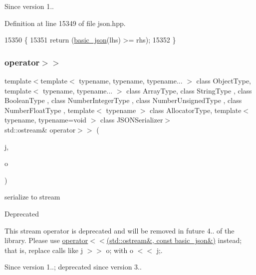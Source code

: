 \begin{DoxySince}{Since}
version 1.. 
\end{DoxySince}


Definition at line 15349 of file json.\+hpp.


\begin{DoxyCode}
15350     \{
15351         \textcolor{keywordflow}{return} (\hyperlink{classnlohmann_1_1basic__json_aed115142bd0c6c66c864700e0467df55}{basic\_json}(lhs) >= rhs);
15352     \}
\end{DoxyCode}
\mbox{\label{classnlohmann_1_1basic__json_a34d6a60dd99e9f33b8273a1c8db5669b}} 
\subsubsection{\texorpdfstring{operator$>$$>$}{operator>>}\hspace{0.1cm}{\footnotesize\ttfamily [1/2]}}
{\footnotesize\ttfamily template$<$template$<$ typename, typename, typename... $>$ class Object\+Type, template$<$ typename, typename... $>$ class Array\+Type, class String\+Type , class Boolean\+Type , class Number\+Integer\+Type , class Number\+Unsigned\+Type , class Number\+Float\+Type , template$<$ typename $>$ class Allocator\+Type, template$<$ typename, typename=void $>$ class J\+S\+O\+N\+Serializer$>$ \\
std\+::ostream\& operator$>$$>$ (\begin{DoxyParamCaption}\item[{const \hyperlink{classnlohmann_1_1basic__json}{basic\+\_\+json}$<$ Object\+Type, Array\+Type, String\+Type, Boolean\+Type, Number\+Integer\+Type, Number\+Unsigned\+Type, Number\+Float\+Type, Allocator\+Type, J\+S\+O\+N\+Serializer $>$ \&}]{j,  }\item[{std\+::ostream \&}]{o }\end{DoxyParamCaption})\hspace{0.3cm}{\ttfamily [friend]}}



serialize to stream 

\begin{DoxyRefDesc}{Deprecated}
\item[\hyperlink{deprecated__deprecated000002}{Deprecated}]This stream operator is deprecated and will be removed in future 4.. of the library. Please use \hyperlink{classnlohmann_1_1basic__json_a5e34c5435e557d0bf666bd7311211405}{operator$<$$<$(std\+::ostream\&, const basic\+\_\+json\&)} instead; that is, replace calls like {\ttfamily j $>$$>$ o;} with {\ttfamily o $<$$<$ j;}. \end{DoxyRefDesc}
\begin{DoxySince}{Since}
version 1..; deprecated since version 3.. 
\end{DoxySince}


